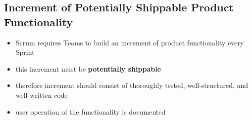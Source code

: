 \subsection{Increment of Potentially Shippable Product Functionality}
\begin{itemize}
  \item Scrum requires Teams to build an increment of product functionality every Sprint
  \item this increment must be \textbf{potentially shippable}
  \item therefore increment should consist of thoroughly tested, well-structured, and well-written code
  \item user operation of the functionality is documented
\end{itemize}

